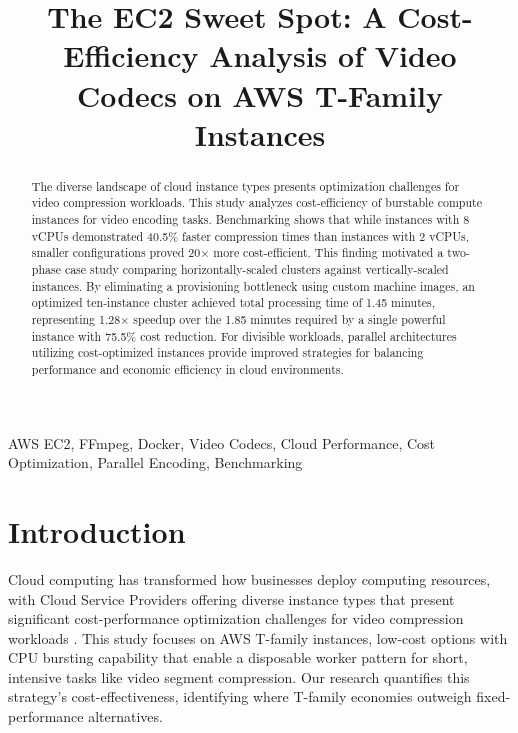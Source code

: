 \documentclass[conference]{IEEEtran}
\begin{document}
	
	\title{The EC2 Sweet Spot: A Cost-Efficiency Analysis of Video Codecs on AWS T-Family Instances}
	
	\author{
	}
	
	\maketitle
	
	\begin{abstract}
		The diverse landscape of cloud instance types presents optimization challenges for video compression workloads. This study analyzes cost-efficiency of burstable compute instances for video encoding tasks. Benchmarking shows that while instances with 8 vCPUs demonstrated 40.5\% faster compression times than instances with 2 vCPUs, smaller configurations proved 20× more cost-efficient. This finding motivated a two-phase case study comparing horizontally-scaled clusters against vertically-scaled instances. By eliminating a provisioning bottleneck using custom machine images, an optimized ten-instance cluster achieved total processing time of 1.45 minutes, representing 1.28× speedup over the 1.85 minutes required by a single powerful instance with 75.5\% cost reduction. For divisible workloads, parallel architectures utilizing cost-optimized instances provide improved strategies for balancing performance and economic efficiency in cloud environments.
	\end{abstract}
	
	\begin{IEEEkeywords}
		AWS EC2, FFmpeg, Docker, Video Codecs, Cloud Performance, Cost Optimization, Parallel Encoding, Benchmarking
	\end{IEEEkeywords}
	
	\section{Introduction}
	
	Cloud computing has transformed how businesses deploy computing resources, with Cloud Service Providers offering diverse instance types that present significant cost-performance optimization challenges for video compression workloads \cite{b1,b17}. This study focuses on AWS T-family instances, low-cost options with CPU bursting capability that enable a disposable worker pattern for short, intensive tasks like video segment compression. Our research quantifies this strategy's cost-effectiveness, identifying where T-family economies outweigh fixed-performance alternatives.
	
\end{document}
